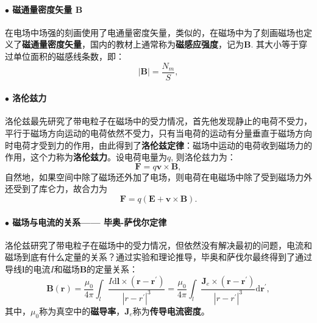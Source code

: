 \documentclass[10pt,reqno, final]{ctexart}
\begin{document}
\paragraph{$\bullet$ 磁通量密度矢量 $\bm{B}$} 在电场中场强的刻画使用了电通量密度矢量，类似的，在磁场中为了刻画磁场也定义了\textbf{磁通量密度矢量}，国内的教材上通常称为\textbf{磁感应强度}，记为$\bm{B}$. 其大小等于穿过单位面积的磁感线条数，即：
\begin{equation}\label{citongmidu}
|\bm{B}| = \frac{N_m}{S}, 
\end{equation}
{}

\paragraph{$\bullet$ 洛伦兹力} 洛伦兹最先研究了带电粒子在磁场中的受力情况，首先他发现静止的电荷不受力，平行于磁场方向运动的电荷依然不受力，只有当电荷的运动有分量垂直于磁场方向时电荷才受到力的作用，由此得到了\textbf{洛伦兹定律}：磁场中运动的电荷收到磁场力的作用，这个力称为\textbf{洛伦兹力}。设电荷电量为$q$, 则洛伦兹力为：
\begin{equation}
\bm{F} = q\bm{v}\times\bm{B},
\end{equation}
自然地，如果空间中除了磁场还外加了电场，则电荷在电磁场中除了受到磁场力外还受到了库仑力，故合力为
\begin{equation}\label{lorentz}
\bm{F} = q(\bm{E+v\times B}).
\end{equation}
\paragraph{$\bullet$ 磁场与电流的关系—— 毕奥-萨伐尔定律} 洛伦兹研究了带电粒子在磁场中的受力情况，但依然没有解决最初的问题，电流和磁场到底有什么定量的关系？通过实验和理论推导，毕奥和萨伐尔最终得到了通过导线$\bm{l}$的电流$I$和磁场$\bm{B}$的定量关系：
\begin{equation}\label{biotsavertthem}
\displaystyle \bm{B}(\bm{r}) = \frac{\mu_0}{4\pi}\int_l \frac{I\mathrm{d}\bm{l}\times(\bm{r}-\bm{r}^\prime)}{|r-r^\prime|^3}=\frac{\mu_0}{4\pi}\int_l \frac{\bm{J}_e\times(\bm{r}-\bm{r}^\prime)}{|r-r^\prime|^3}\mathrm{d}\bm{r}^\prime, 
\end{equation}
其中，$\mu_0$称为真空中的\textbf{磁导率}，$\bm{J}_e$称为\textbf{传导电流密度}。
\end{document}
